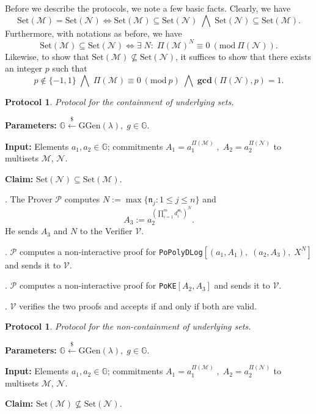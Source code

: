 \documentclass[11pt, lettersize, notitlepage, leqno, footskip=0.6cm]{article}
\newcommand{\pl}{\prod\limits}
\newcommand{\sett}{\mr{Set}}
\newcommand{\LRA}{\Longleftrightarrow}
\newcommand{\mf}{\mathfrak}
\newcommand{\mc}{\mathcal}
\newcommand{\mb}{\mathbb}
\newcommand{\mbf}{\mathbf}
\newcommand{\mr}{\mathrm}
\newcommand{\lamb}{\lambda}
\newcommand{\sub}{\subseteq}
\newcommand{\nsub}{\nsubseteq}
\newcommand{\mP}{\mc{P}}
\newcommand{\V}{\mc{V}}
\newcommand{\vs}{\vspace{-0.15cm}}
\newcommand{\noin}{\noindent}
\newcommand{\Mod}[1]{\ (\mathrm{mod}\ #1)}
\newcommand{\GCD}{\mbf{gcd}}
\newtheorem{Prot}[Thm]{Protocol}
\numberwithin{equation}{section}
\begin{document}
\noin Before we describe the protocols, we note a few basic facts. Clearly, we have \vs $$\sett(\mc{M}) = \sett(\mc{N})\LRA \sett(\mc{M}) \sub \sett(\mc{N})\;\bigwedge\; \sett(\mc{N}) \sub \sett(\mc{M}).$$ Furthermore, with notations as before, we have \vs $$\sett(\mc{M})\sub \sett(\mc{N})\LRA \exists\; N:\;\Pi(\mc{M})^N\equiv 0\Mod{\Pi(\mc{N})}.$$ Likewise, to show that $\sett(\mc{M})\nsub \sett(\mc{N})$, it suffices to show that there exists an integer $p$ such that \vs $$p\notin \{-1,1\}   \;\bigwedge\;\Pi(\mc{M})\equiv 0\Mod{p} \;\bigwedge\; \GCD(\Pi(\mc{N}),{p})=1.$$ 


\begin{Prot} Protocol for the containment of underlying sets.\end{Prot} \vspace{-0.2cm}

\noin \textbf{Parameters:} $\mb{G}\xleftarrow{\$} \mr{GGen}(\lamb), \; g\in \mb{G}$.

\noin \textbf{Input:} Elements $a_1,a_2\in\mb{G}$; commitments $A_1 = a_1^{\Pi(\mc{M})}\;,\;A_2 = a_2^{\Pi(\mc{N})}$ to multisets $\mc{M}$, $\mc{N}$.

\noin \textbf{Claim:} $\sett(\mc{N})\sub \sett(\mc{M})$.

\noin 1. The Prover $\mP$ computes $N:= \max\{\mf{n}_j:1\leq j\leq n \}$ and \vs $$A_3:= a_2^{(\pl_{i=1}^m d_i^{\mf{m}_i})^N}.$$ He sends $A_3$ and $N$ to the Verifier $\V$.

\noin 2. $\mP$ computes a non-interactive proof for \verb|PoPolyDLog|$[(a_1, A_1),\;(a_2, A_3),\;X^N]$ and sends it to $\V$.

\noin 3. $\mP$ computes a non-interactive proof for \verb|PoKE|$[A_2,A_3]$ and sends it to $\V$.

\noin 4. $\V$ verifies the two proofs and accepts if and only if both are valid.

\bigskip

\begin{Prot} Protocol for the non-containment of underlying sets.\end{Prot}\vspace{-0.3cm}

\noin \textbf{Parameters:} $\mb{G}\xleftarrow{\$} \mr{GGen}(\lamb), \; g\in \mb{G}$. 

\noin \textbf{Input:} Elements $a_1,a_2\in\mb{G}$; commitments $A_1 = a_1^{\Pi(\mc{M})}\;,\;A_2 = a_2^{\Pi(\mc{N})}$ to multisets $\mc{M}$, $\mc{N}$.

\noin \textbf{Claim:} $\sett(\mc{M})\nsub \sett(\mc{N})$.
\end{document}
